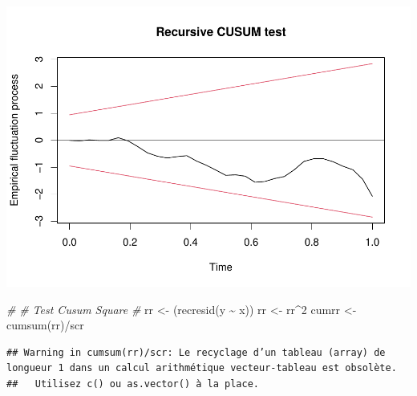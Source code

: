 \documentclass[
]{article}
\newenvironment{Shaded}{\begin{snugshade}}{\end{snugshade}}
\newcommand{\CommentTok}[1]{\textcolor[rgb]{0.56,0.35,0.01}{\textit{#1}}}
\newcommand{\DecValTok}[1]{\textcolor[rgb]{0.00,0.00,0.81}{#1}}
\newcommand{\FunctionTok}[1]{\textcolor[rgb]{0.00,0.00,0.00}{#1}}
\newcommand{\NormalTok}[1]{#1}
\newcommand{\OtherTok}[1]{\textcolor[rgb]{0.56,0.35,0.01}{#1}}
\newcommand{\SpecialCharTok}[1]{\textcolor[rgb]{0.00,0.00,0.00}{#1}}
\begin{document}
\includegraphics{Projet_econometrie_II_files/figure-latex/unnamed-chunk-6-1.pdf}

\begin{Shaded}
\begin{Highlighting}[]
\CommentTok{\#}
\CommentTok{\# Test Cusum Square}
\CommentTok{\#}
\NormalTok{rr }\OtherTok{\textless{}{-}}\NormalTok{ (}\FunctionTok{recresid}\NormalTok{(y }\SpecialCharTok{\textasciitilde{}}\NormalTok{ x))}
\NormalTok{rr }\OtherTok{\textless{}{-}}\NormalTok{ rr}\SpecialCharTok{\^{}}\DecValTok{2}
\NormalTok{cumrr }\OtherTok{\textless{}{-}} \FunctionTok{cumsum}\NormalTok{(rr)}\SpecialCharTok{/}\NormalTok{scr}
\end{Highlighting}
\end{Shaded}

\begin{verbatim}
## Warning in cumsum(rr)/scr: Le recyclage d’un tableau (array) de longueur 1 dans un calcul arithmétique vecteur-tableau est obsolète.
##   Utilisez c() ou as.vector() à la place.
\end{verbatim}
\end{document}
